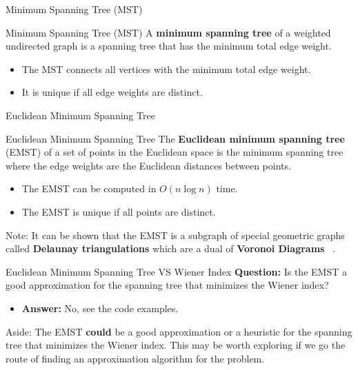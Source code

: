 \documentclass[11pt]{beamer}
\begin{document}
\begin{frame}{Minimum Spanning Tree (MST)}
	\begin{block}{Minimum Spanning Tree (MST)}
		A \textbf{minimum spanning tree} of a weighted undirected graph is a spanning tree that has the minimum total edge weight.
		\begin{itemize}
			\item The MST connects all vertices with the minimum total edge weight.
			\item It is unique if all edge weights are distinct.
		\end{itemize}
	\end{block}
\end{frame}

\begin{frame}{Euclidean Minimum Spanning Tree}
	\begin{block}{Euclidean Minimum Spanning Tree}
		The \textbf{Euclidean minimum spanning tree} (EMST) of a set of points in the Euclidean space is the minimum spanning tree where the edge weights are the Euclidean distances between points.
		\begin{itemize}
			\item The EMST can be computed in $O(n \log n)$ time.
			\item The EMST is unique if all points are distinct.
		\end{itemize}
	\end{block}
	\pause
	\vspace{0.5cm}

	Note: It can be shown that the EMST is a subgraph of special geometric graphs called \textbf{Delaunay triangulations} which are a dual of \textbf{Voronoi Diagrams} ~\cite{book:deberg_computational_geometry}.
\end{frame}

\begin{frame}{Euclidean Minimum Spanning Tree VS Wiener Index}
	\textbf{Question:} Is the EMST a good approximation for the spanning tree that minimizes the Wiener index?
	\vspace{0.3cm}
	\begin{itemize}
		\item \textbf{Answer:} No, see the code examples.
	\end{itemize}
	\vspace{0.5cm}

	\pause
	Aside: The EMST \textbf{could} be a good approximation or a heuristic for the spanning tree that minimizes the Wiener index. This may be worth exploring if we go the route of finding an approximation algorithm for the problem.
\end{frame}
\end{document}
